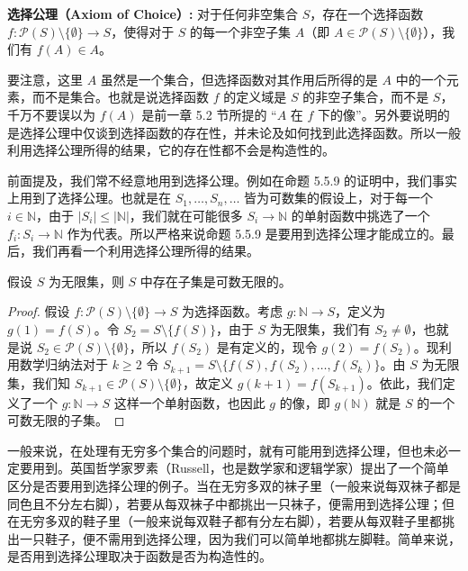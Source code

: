 \textbf{选择公理（Axiom of Choice）:} {\kaishu 对于任何非空集合 $S$，存在一个选择函数 $f : \mathcal{P}(S) \setminus \{\emptyset\} \to S$，使得对于 $S$ 的每一个非空子集 $A$（即 $A \in \mathcal{P}(S) \setminus \{\emptyset\}$），我们有 $f(A) \in A$。}

要注意，这里 $A$ 虽然是一个集合，但选择函数对其作用后所得的是 $A$ 中的一个元素，而不是集合。也就是说选择函数 $f$ 的定义域是 $S$ 的非空子集合，而不是 $S$，千万不要误以为 $f(A)$ 是前一章 5.2 节所提的 “$A$ 在 $f$ 下的像”。另外要说明的是选择公理中仅谈到选择函数的存在性，并未论及如何找到此选择函数。所以一般利用选择公理所得的结果，它的存在性都不会是构造性的。

前面提及，我们常不经意地用到选择公理。例如在命题 5.5.9 的证明中，我们事实上用到了选择公理。也就是在 $S_1, \dots, S_n, \dots$ 皆为可数集的假设上，对于每一个 $i \in \mathbb{N}$，由于 $|S_i| \leq |\mathbb{N}|$，我们就在可能很多 $S_i \to \mathbb{N}$ 的单射函数中挑选了一个 $f_i : S_i \to \mathbb{N}$ 作为代表。所以严格来说命题 5.5.9 是要用到选择公理才能成立的。最后，我们再看一个利用选择公理所得的结果。

\begin{proposition}
假设 $S$ 为无限集，则 $S$ 中存在子集是可数无限的。
\end{proposition}

\begin{proof}
假设 $f : \mathcal{P}(S) \setminus \{\emptyset\} \to S$ 为选择函数。考虑 $g : \mathbb{N} \to S$，定义为 $g(1) = f(S)$。令 $S_2 = S \setminus \{f(S)\}$，由于 $S$ 为无限集，我们有 $S_2 \neq \emptyset$，也就是说 $S_2 \in \mathcal{P}(S) \setminus \{\emptyset\}$，所以 $f(S_2)$ 是有定义的，现令 $g(2) = f(S_2)$。现利用数学归纳法对于 $k \geq 2$ 令 $S_{k+1} = S \setminus \{f(S), f(S_2), \dots, f(S_k)\}$。由 $S$ 为无限集，我们知 $S_{k+1} \in \mathcal{P}(S) \setminus \{\emptyset\}$，故定义 $g(k+1) = f(S_{k+1})$。依此，我们定义了一个 $g : \mathbb{N} \to S$ 这样一个单射函数，也因此 $g$ 的像，即 $g(\mathbb{N})$ 就是 $S$ 的一个可数无限的子集。
\end{proof}

一般来说，在处理有无穷多个集合的问题时，就有可能用到选择公理，但也未必一定要用到。英国哲学家罗素（Russell，也是数学家和逻辑学家）提出了一个简单区分是否要用到选择公理的例子。当在无穷多双的袜子里（一般来说每双袜子都是同色且不分左右脚），若要从每双袜子中都挑出一只袜子，便需用到选择公理；但在无穷多双的鞋子里（一般来说每双鞋子都有分左右脚），若要从每双鞋子里都挑出一只鞋子，便不需用到选择公理，因为我们可以简单地都挑左脚鞋。简单来说，是否用到选择公理取决于函数是否为构造性的。

